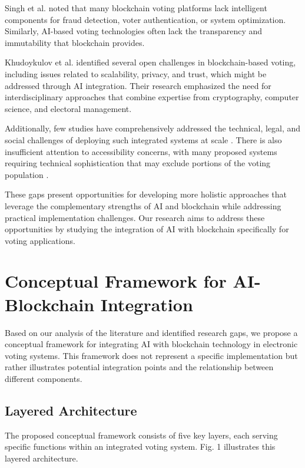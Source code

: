 \documentclass[conference]{IEEEtran}
\begin{document}
Singh et al. \cite{b5} noted that many blockchain voting platforms lack intelligent components for fraud detection, voter authentication, or system optimization. Similarly, AI-based voting technologies often lack the transparency and immutability that blockchain provides.

Khudoykulov et al. \cite{b1} identified several open challenges in blockchain-based voting, including issues related to scalability, privacy, and trust, which might be addressed through AI integration. Their research emphasized the need for interdisciplinary approaches that combine expertise from cryptography, computer science, and electoral management.

Additionally, few studies have comprehensively addressed the technical, legal, and social challenges of deploying such integrated systems at scale \cite{b7}. There is also insufficient attention to accessibility concerns, with many proposed systems requiring technical sophistication that may exclude portions of the voting population \cite{b6}.

These gaps present opportunities for developing more holistic approaches that leverage the complementary strengths of AI and blockchain while addressing practical implementation challenges. Our research aims to address these opportunities by studying the integration of AI with blockchain specifically for voting applications.

\section{Conceptual Framework for AI-Blockchain Integration}
Based on our analysis of the literature and identified research gaps, we propose a conceptual framework for integrating AI with blockchain technology in electronic voting systems. This framework does not represent a specific implementation but rather illustrates potential integration points and the relationship between different components.

\subsection{Layered Architecture}
The proposed conceptual framework consists of five key layers, each serving specific functions within an integrated voting system. Fig. 1 illustrates this layered architecture.
\end{document}
